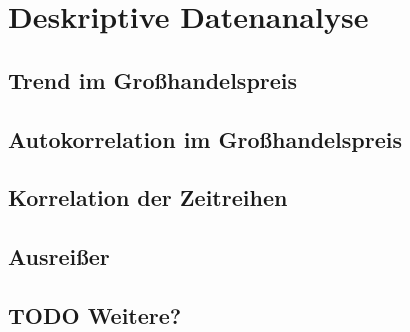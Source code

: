 \section{Deskriptive Datenanalyse}

\subsection{Trend im Großhandelspreis}

\subsection{Autokorrelation im Großhandelspreis}

\subsection{Korrelation der Zeitreihen}

\subsection{Ausreißer}


\subsection{TODO Weitere?}
